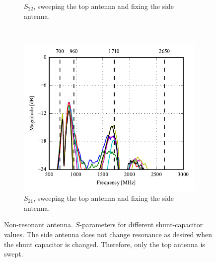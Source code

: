 \begin{figure}[htbp]
\begin{subfigure}{0.49\linewidth}
        \caption{$S_{22}$, sweeping the top antenna and fixing the side antenna.}
    \end{subfigure}
    \\
    \begin{subfigure}{0.49\linewidth}
        \centering
        \includegraphics{img/tech_sol/nonresonant/prototype/s21_csh1.pdf}
        \caption{$S_{21}$, sweeping the top antenna and fixing the side antenna.}
    \end{subfigure}
    \caption{Non-resonant antenna. $S$-parameters for different shunt-capacitor values. The side antenna does not change resonance as desired when the shunt capacitor is changed. Therefore, only the top antenna is swept.}
    \label{fig:nonresonant_proto_sweep_sparams}
\end{figure}

